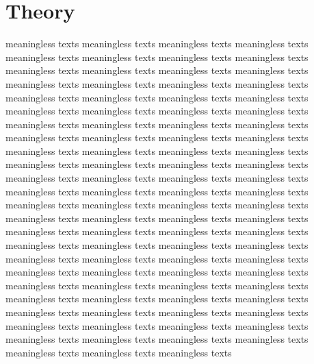 \documentclass[12pt, twoside, notitlepage, twocolumn]{article}
\begin{document}
    \section{Theory}
    meaningless texts meaningless texts meaningless texts meaningless texts meaningless texts 
    meaningless texts meaningless texts meaningless texts meaningless texts meaningless texts 
    meaningless texts meaningless texts meaningless texts meaningless texts meaningless texts 
    meaningless texts meaningless texts meaningless texts meaningless texts meaningless texts 
    meaningless texts meaningless texts meaningless texts meaningless texts meaningless texts 
    meaningless texts meaningless texts meaningless texts meaningless texts meaningless texts 
    meaningless texts meaningless texts meaningless texts meaningless texts meaningless texts 
    meaningless texts meaningless texts meaningless texts meaningless texts meaningless texts 
    meaningless texts meaningless texts meaningless texts meaningless texts meaningless texts 
    meaningless texts meaningless texts meaningless texts meaningless texts meaningless texts 
    meaningless texts meaningless texts meaningless texts meaningless texts meaningless texts 
    meaningless texts meaningless texts meaningless texts meaningless texts meaningless texts 
    meaningless texts meaningless texts meaningless texts meaningless texts meaningless texts 
    meaningless texts meaningless texts meaningless texts meaningless texts meaningless texts 
    meaningless texts meaningless texts meaningless texts meaningless texts meaningless texts 
    meaningless texts meaningless texts meaningless texts meaningless texts meaningless texts 
    meaningless texts meaningless texts meaningless texts meaningless texts meaningless texts 
    meaningless texts meaningless texts meaningless texts meaningless texts meaningless texts 
    meaningless texts meaningless texts meaningless texts meaningless texts meaningless texts 
    
\end{document}
